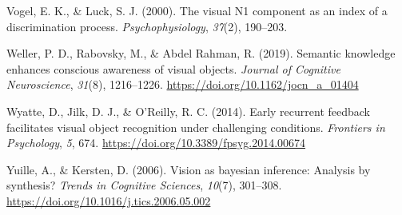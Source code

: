 \documentclass[
  english,
  man,floatsintext]{apa7}
\begin{document}
\leavevmode\hypertarget{ref-vogel2000}{}%
Vogel, E. K., \& Luck, S. J. (2000). The visual N1 component as an index of a discrimination process. \emph{Psychophysiology}, \emph{37}(2), 190--203.

\leavevmode\hypertarget{ref-weller2019}{}%
Weller, P. D., Rabovsky, M., \& Abdel Rahman, R. (2019). Semantic knowledge enhances conscious awareness of visual objects. \emph{Journal of Cognitive Neuroscience}, \emph{31}(8), 1216--1226. \url{https://doi.org/10.1162/jocn_a_01404}

\leavevmode\hypertarget{ref-wyatte2014}{}%
Wyatte, D., Jilk, D. J., \& O'Reilly, R. C. (2014). Early recurrent feedback facilitates visual object recognition under challenging conditions. \emph{Frontiers in Psychology}, \emph{5}, 674. \url{https://doi.org/10.3389/fpsyg.2014.00674}

\leavevmode\hypertarget{ref-yuille2006}{}%
Yuille, A., \& Kersten, D. (2006). Vision as bayesian inference: Analysis by synthesis? \emph{Trends in Cognitive Sciences}, \emph{10}(7), 301--308. \url{https://doi.org/10.1016/j.tics.2006.05.002}

\endgroup
\end{document}
